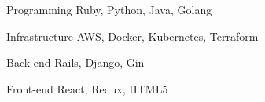
\begin{cvskills}
  \cvskill
    {Programming} %
    {Ruby, Python, Java, Golang} %

  \cvskill
    {Infrastructure} %
    {AWS, Docker, Kubernetes, Terraform} %

  \cvskill
    {Back-end} %
    {Rails, Django, Gin} %

  \cvskill
    {Front-end} %
    {React, Redux, HTML5} %


\end{cvskills}